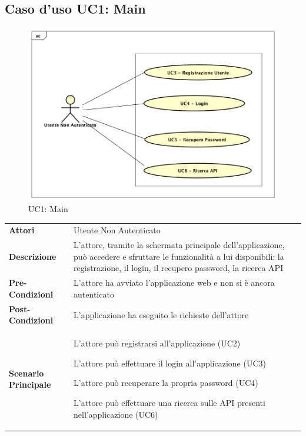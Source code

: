 \newpage
\subsection{Caso d'uso UC1:  Main }
\label{UC1}
\begin{figure}[ht]
	\centering
	\includegraphics[scale=0.45]{UML/UC1.png}
	\caption{UC1: Main}
\end{figure}

\renewcommand*{\arraystretch}{1.6}
\begin{longtable}{ l | p{11cm}}
	\hline
	\rowcolor{Gray}
	 \multicolumn{2}{c}{UC1 - Main} \\
	 \hline
	\textbf{Attori} & Utente Non Autenticato  \\
	\textbf{Descrizione} & L'attore, tramite la schermata principale dell'applicazione, può accedere e sfruttare le funzionalità a lui disponibili: la registrazione, il login, il recupero password, la ricerca API  \\
	\textbf{Pre-Condizioni} & L'attore ha avviato l'applicazione web e non si è ancora autenticato \\
	\textbf{Post-Condizioni}&L'applicazione ha eseguito le richieste dell'attore\\
	\textbf{Scenario Principale} & \begin{enumerate*}[label=(\arabic*.),itemjoin={\newline}]
		\item L'attore può registrarsi all'applicazione (UC2)
		\item L'attore può effettuare il login all'applicazione (UC3)
		\item L'attore può recuperare la propria password (UC4)
		\item L'attore può effettuare una ricerca sulle API presenti nell'applicazione (UC6)
	\end{enumerate*}\\
\end{longtable}